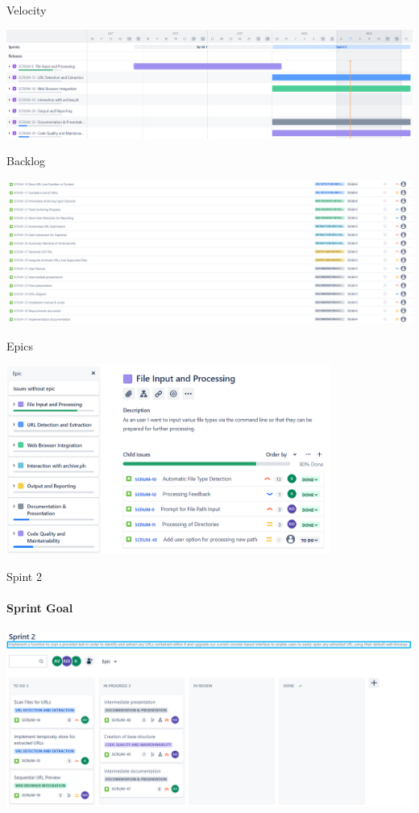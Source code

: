 \documentclass[
    ngerman,%
    authorontitle=true,
]{bfhbeamer}
\begin{document}
    \begin{frame}{Velocity}
        \begin{center}
            \includegraphics[width=1\textwidth]{pictures/GANT-Diagramm}
        \end{center}
    \end{frame}

    \begin{frame}{Backlog}
        \begin{center}
            \includegraphics[width=1\textwidth]{pictures/Backlog 1}
        \end{center}
    \end{frame}

    \begin{frame}{Epics}
        \begin{center}
            \includegraphics[width=0.8\textwidth]{pictures/Epic}
        \end{center}
    \end{frame}

    \begin{frame}{Spint 2}
        \framesubtitle{Sprint Goal}
        \includegraphics[width=1\textwidth]{pictures/SprintBacklog 1}
    \end{frame}
\end{document}
